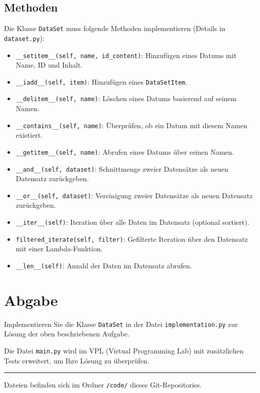 \documentclass[a4paper, 12pt]{article}
\begin{document}
\subsection{Methoden}
Die Klasse \texttt{DataSet} muss folgende Methoden implementieren (Details in \texttt{dataset.py}):
\begin{itemize}[label=$\bullet$, leftmargin=2em]
    \item \texttt{\_\_setitem\_\_(self, name, id\_content)}: Hinzufügen eines Datums mit Name, ID und Inhalt.
    \item \texttt{\_\_iadd\_\_(self, item)}: Hinzufügen eines \texttt{DataSetItem}.
    \item \texttt{\_\_delitem\_\_(self, name)}: Löschen eines Datums basierend auf seinem Namen.
    \item \texttt{\_\_contains\_\_(self, name)}: Überprüfen, ob ein Datum mit diesem Namen existiert.
    \item \texttt{\_\_getitem\_\_(self, name)}: Abrufen eines Datums über seinen Namen.
    \item \texttt{\_\_and\_\_(self, dataset)}: Schnittmenge zweier Datensätze als neuen Datensatz zurückgeben.
    \item \texttt{\_\_or\_\_(self, dataset)}: Vereinigung zweier Datensätze als neuen Datensatz zurückgeben.
    \item \texttt{\_\_iter\_\_(self)}: Iteration über alle Daten im Datensatz (optional sortiert).
    \item \texttt{filtered\_iterate(self, filter)}: Gefilterte Iteration über den Datensatz mit einer Lambda-Funktion.
    \item \texttt{\_\_len\_\_(self)}: Anzahl der Daten im Datensatz abrufen.
\end{itemize}

\section{Abgabe}
Implementieren Sie die Klasse \texttt{DataSet} in der Datei \texttt{implementation.py} zur Lösung der oben beschriebenen Aufgabe.

Die Datei \texttt{main.py} wird im VPL (Virtual Programming Lab) mit zusätzlichen Tests erweitert, um Ihre Lösung zu überprüfen.

\hrule
\footnotesize Dateien befinden sich im Ordner \texttt{/code/} dieses Git-Repositories.
\end{document}
